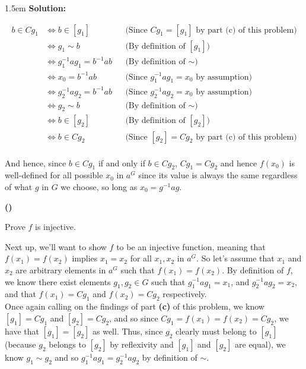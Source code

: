 \documentclass{article}
\newenvironment{solution}{
	\vspace{.5em}
	\par
	\begin{adjustwidth}{1.5em}{}
	\textbf{{Solution:}}
	\par
	\vspace{.5em}
}{
	\vspace{1em}
	\end{adjustwidth}
	\setcounter{step}{0}
	\newpage
}
\newcounter{step}
\renewcommand{\thestep}{\Roman{step}}
\newenvironment{step}{
	\refstepcounter{step}
	\vspace{1em}\par\noindent
	\ignorespaces\noindent\textbf{(\thestep)}
	\ignorespaces
}{
	\par
	\vspace{1.5em}
}
\newcounter{problem}
\begin{document}
\begin{solution}
	\begin{align*}
		b \in Cg_{1} &\iff b \in [g_{1}] &&\text{(Since $Cg_{1} = [g_{1}]$ by part (c) of this problem)} \\
		&\iff g_{1} \sim b &&\text{(By definition of $[g_{1}]$)} \\
		&\iff g_{1}^{-1}ag_{1} = b^{-1}ab &&\text{(By definition of $\sim$)} \\
		&\iff x_{0} = b^{-1}ab &&\text{(Since $g_{1}^{-1}ag_{1} = x_{0}$ by assumption)} \\
		&\iff g_{2}^{-1}ag_{2} = b^{-1}ab &&\text{(Since $g_{2}^{-1}ag_{2} = x_{0}$ by assumption)} \\
		&\iff g_{2} \sim b &&\text{(By definition of $\sim$)} \\
		&\iff b \in [g_{2}] &&\text{(By definition of $[g_{2}]$)} \\
		&\iff b \in Cg_{2} &&\text{(Since $[g_{2}] = Cg_{2}$ by part (c) of this problem)} \\
	\end{align*}

	And hence, since $b \in Cg_{1}$ if and only if $b \in Cg_{2}$, $Cg_{1} = Cg_{2}$ and hence $f(x_{0})$ is well-defined for all possible $x_{0}$ in $a^{G}$ since its value is always the same regardless of what $g$ in $G$ we choose, so long as $x_{0} = g^{-1}ag$.

	\begin{step}
		Prove $f$ is injective.
	\end{step}

	Next up, we'll want to show $f$ to be an injective function, meaning that $f(x_{1}) = f(x_{2})$ implies $x_{1} = x_{2}$ for all $x_{1}, x_{2}$ in $a^{G}$. So let's assume that $x_{1}$ and $x_{2}$ are arbitrary elements in $a^{G}$ such that $f(x_{1}) = f(x_{2})$. By definition of $f$, we know there exist elements $g_{1}, g_{2} \in G$ such that $g_{1}^{-1}ag_{1} = x_{1}$, and $g_{2}^{-1}ag_{2} = x_{2}$, and that $f(x_{1}) = Cg_{1}$ and $f(x_{2}) = Cg_{2}$ respectively. \\

	Once again calling on the findings of part \textbf{(c)} of this problem, we know $[g_{1}] = Cg_{1}$ and $[g_{2}] = Cg_{2}$, and so since $Cg_{1} = f(x_{1}) = f(x_{2}) = Cg_{2}$, we have that $[g_{1}] = [g_{2}]$ as well. Thus, since $g_{2}$ clearly must belong to $[g_{1}]$ (because $g_{2}$ belongs to $[g_{2}]$ by reflexivity and $[g_{1}]$ and $[g_{2}]$ are equal), we know $g_{1} \sim g_{2}$ and so $g_{1}^{-1}ag_{1} = g_{2}^{-1}ag_{2}$ by definition of $\sim$. \\


\end{solution}
\end{document}

